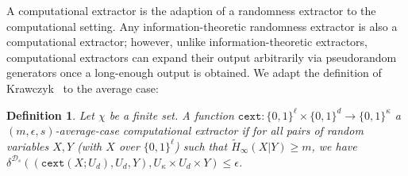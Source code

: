 \documentclass[11pt]{article}
\newcommand{\defref}[1]{\mbox{Definition~\ref{#1}}}
\newcommand{\class}[1]{{\ensuremath{\mathsf{#1}}}}
\newcommand{\gen}{\ensuremath{\class{Gen}}\xspace}
\newcommand{\rep}{\ensuremath{\class{Rep}}\xspace}
\newcommand{\zo}{\ensuremath{\{0, 1\}}}
\newcommand{\dis}{\ensuremath{\mathsf{dis}}}
\newcommand{\hill}{\ensuremath{\mathtt{HILL}}\xspace}
\newcommand{\cext}{\ensuremath{\mathtt{cext}}}
\newtheorem{definition}[theorem]{Definition}
\begin{document}
\iffalse
\begin{definition}
\label{def:comp fuzzy cond}
Let $\mathcal{W}$ be a family of probability distributions over $\mathcal{M}$.  A pair of randomized procedures ``generate'' ($\gen$) and ``reproduce'' ($\rep$) is an $(\mathcal{M}, \mathcal{W}, \tilde{m}, t$)-computational fuzzy conductor that is $(\epsilon, s)$-hard with error $\delta$ if $\gen$ and $\rep$ satisfy the following properties (the first two properties are the same as in \defref{def:comp fuzzy extractor}, with $x$ replacing $r$):
\begin{itemize}
\item The generate procedure $\gen$ on input $w\in \mathcal{M}$ outputs a string $x\in\{0,1\}^\ell$ and a helper string $p\in\{0,1\}^*$.
\item The reproduction procedure $\rep$ takes an element $w'\in\mathcal{M}$ and a bit string $p\in\{0,1\}^*$ as inputs.  The \emph{correctness} property guarantees that if $\dis(w, w')\leq t$ and $(x, p)\leftarrow \gen(w)$, then $\Pr[\rep(w',p) = x] \geq 1-\delta$ where the probability is over the randomness of $(\gen, \rep)$.
If $\dis(w, w') > t$, then no guarantee is provided about the output of $\rep$.
\item The \emph{security} property guarantees that for any distribution $W\in \mathcal{W}$, the string $x$ has high HILL entropy conditioned on $P$.  That is $H^{\hill}_{\epsilon_{cond}, s_{cond}}(X |P)\geq \tilde{m}$.
\end{itemize}
\end{definition}
\fi 

A computational extractor is the adaption of a randomness extractor to the computational setting.  Any information-theoretic randomness extractor is also a computational extractor; however, unlike information-theoretic extractors, computational extractors can expand their output arbitrarily via pseudorandom generators once a long-enough output is obtained. We adapt the definition of Krawczyk~\cite{krawczyk2010cryptographic} to the average case:
\begin{definition}
Let $\chi$ be a finite set.
A function $\cext: \zo^\ell \times \{0,1\}^d \rightarrow \{0,1\}^\kappa$ a \emph{$(m, \epsilon, s)$-average-case computational extractor} if for all pairs
of random variables $X, Y$ (with $X$ over $\zo^\ell$) such that
$\tilde{H}_\infty(X|Y) \ge m$, we have $\delta^{\mathcal{D}_{s}}((\cext(X; U_d), U_d, Y), U_\kappa\times
U_d \times Y) \le \epsilon$.
\end{definition}
\end{document}
